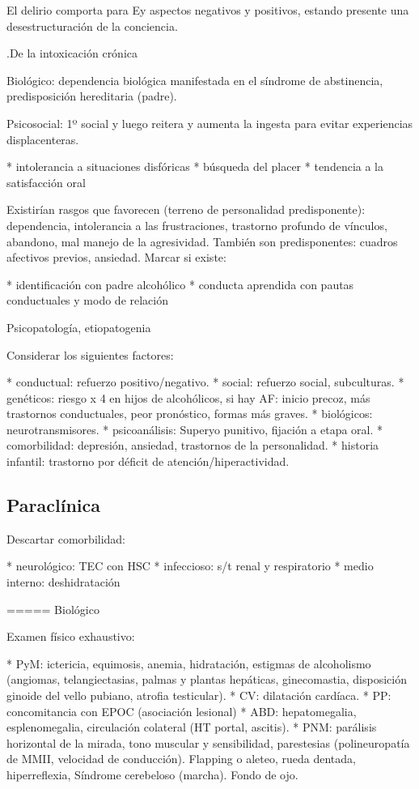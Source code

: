 El delirio comporta para Ey aspectos negativos y positivos, estando presente una desestructuración de la conciencia.

.De la intoxicación crónica

Biológico: dependencia biológica manifestada en el síndrome de abstinencia, predisposición hereditaria (padre).

Psicosocial: 1º social y luego reitera y aumenta la ingesta para evitar experiencias displacenteras.

* intolerancia a situaciones disfóricas
* búsqueda del placer
* tendencia a la satisfacción oral

Existirían rasgos que favorecen (terreno de personalidad predisponente): dependencia, intolerancia a las frustraciones, trastorno profundo de vínculos, abandono, mal manejo de la agresividad. También son predisponentes: cuadros afectivos previos, ansiedad. Marcar si existe:

* identificación con padre alcohólico
* conducta aprendida con pautas conductuales y modo de relación

Psicopatología, etiopatogenia

Considerar los siguientes factores:

* conductual: refuerzo positivo/negativo.
* social: refuerzo social, subculturas.
* genéticos: riesgo x 4 en hijos de alcohólicos, si hay AF: inicio precoz, más trastornos conductuales, peor pronóstico, formas más graves.
* biológicos: neurotransmisores.
* psicoanálisis: Superyo punitivo, fijación a etapa oral.
* comorbilidad: depresión, ansiedad, trastornos de la personalidad.
* historia infantil: trastorno por déficit de atención/hiperactividad.

\subsection*{Paraclínica}

Descartar comorbilidad:

* neurológico: TEC con HSC
* infeccioso: s/t renal y respiratorio
* medio interno: deshidratación

===== Biológico

Examen físico exhaustivo:

* PyM: ictericia, equimosis, anemia, hidratación, estigmas de alcoholismo (angiomas, telangiectasias, palmas y plantas hepáticas, ginecomastia, disposición ginoide del vello pubiano, atrofia testicular).
* CV: dilatación cardíaca.
* PP: concomitancia con EPOC (asociación lesional)
* ABD: hepatomegalia, esplenomegalia, circulación colateral (HT portal, ascitis).
* PNM: parálisis horizontal de la mirada, tono muscular y sensibilidad, parestesias (polineuropatía de MMII, velocidad de conducción). Flapping o aleteo, rueda dentada, hiperreflexia, Síndrome cerebeloso (marcha). Fondo de ojo.

